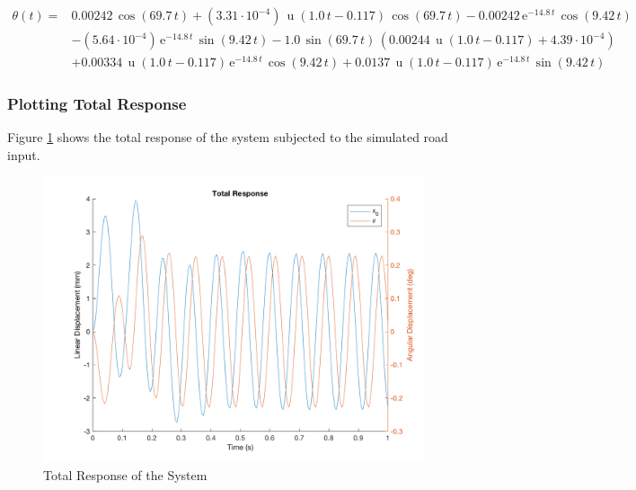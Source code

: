 \documentclass[12pt]{article}
\begin{document}
\begin{equation}
\begin{split}
	\theta (t) =& 0.00242\, \cos\!(69.7\, t) + (3.31\cdot 10^{-4})\, \mathop{\mathrm{u}}\nolimits\!(1.0\, t - 0.117)\, \cos\!(69.7\, t) - 0.00242\, \mathrm{e}^{- 14.8\, t}\, \cos\!(9.42\, t) \\
	 &- (5.64\cdot 10^{-4})\, \mathrm{e}^{- 14.8\, t}\, \sin\!(9.42\, t) - 1.0\, \sin\!(69.7\, t)\, (0.00244\, \mathop{\mathrm{u}}\nolimits\!(1.0\, t - 0.117) + 4.39\cdot 10^{-4}) \\
	 &+ 0.00334\, \mathop{\mathrm{u}}\nolimits\!(1.0\, t - 0.117)\, \mathrm{e}^{- 14.8\, t}\, \cos\!(9.42\, t) + 0.0137\, \mathop{\mathrm{u}}\nolimits\!(1.0\, t - 0.117)\, \mathrm{e}^{- 14.8\, t}\, \sin\!(9.42\, t)
\end{split}
\end{equation}

\subsubsection{Plotting Total Response}
Figure \ref{fig:totalResp} shows the total response of the system subjected to the simulated road input. 
\begin{figure}[h!]
	\centering
	\includegraphics[width=.8\textwidth]{./matlab/totalResp.png}
	\caption{Total Response of the System}
	\label{fig:totalResp}
\end{figure}
\end{document}
